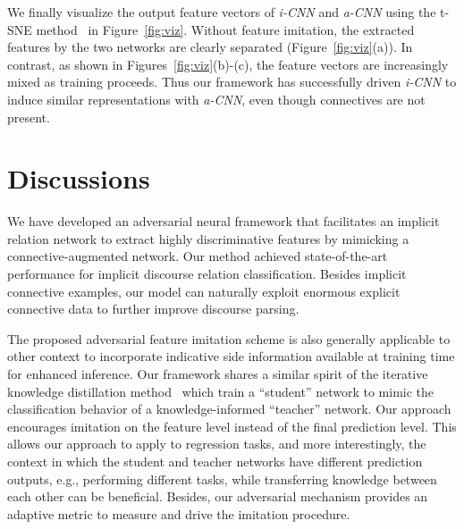\documentclass[11pt,a4paper]{article}
\begin{document}
We finally visualize the output feature vectors of {\it i-CNN} and {\it a-CNN} using the t-SNE method~\cite{maaten2008visualizing} in Figure~\ref{fig:viz}. Without feature imitation, the extracted features by the two networks are clearly separated (Figure~\ref{fig:viz}(a)). In contrast, as shown in Figures~\ref{fig:viz}(b)-(c), the feature vectors are increasingly mixed as training proceeds. Thus our framework has successfully driven {\it i-CNN} to induce similar representations with {\it a-CNN}, even though connectives are not present.

\section{Discussions}\label{sec:conclude}
We have developed an adversarial neural framework that facilitates an implicit relation network to extract highly discriminative features by mimicking a connective-augmented network. Our method achieved state-of-the-art performance for implicit discourse relation classification. Besides implicit connective examples, our model can naturally exploit enormous explicit connective data to further improve discourse parsing.

The proposed adversarial feature imitation scheme is also generally applicable to other context to incorporate indicative side information available at training time for enhanced inference. Our framework shares a similar spirit of the iterative knowledge distillation method~\cite{hu2016harnessing,hu2016deep} which train a ``student'' network to mimic the classification behavior of a knowledge-informed ``teacher'' network. Our approach encourages imitation on the feature level instead of the final prediction level. This allows our approach to apply to regression tasks, and more interestingly, the context in which the student and teacher networks have different prediction outputs, e.g., performing different tasks, while transferring knowledge between each other can be beneficial. Besides, our adversarial mechanism provides an adaptive metric to measure and drive the imitation procedure.

\balance



\clearpage
\end{document}
